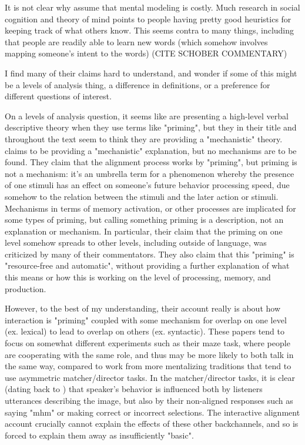 \documentclass[]{article}
\begin{document}
It is not clear why \cite{pickering2004} assume that mental modeling is costly. Much research in social cognition and theory of mind points to people having pretty good heuristics for keeping track of what others know. This seems contra to many things, including that people are readily able to learn new words (which somehow involves mapping someone's intent to the words) (CITE SCHOBER COMMENTARY)

I find many of their claims hard to understand, and wonder if some of this might be a levels of analysis thing, a difference in definitions, or a preference for different questions of interest. 

On a levels of analysis question, it seems like \cite{pickering2004} are presenting a high-level verbal descriptive theory when they use terms like "priming", but they in their title and throughout the text seem to think they are providing a "mechanistic" theory. \cite{pickering2004} claims to be providing a "mechanistic" explanation, but no mechanisms are to be found. They claim that the alignment process works by "priming", but priming is not a mechanism: it's an umbrella term for a phenomenon whereby the presence of one stimuli has an effect on someone's future behavior processing speed, due somehow to the relation between the stimuli and the later action or stimuli. Mechanisms in terms of memory activation, or other processes are implicated for some types of priming, but calling something priming is a description, not an explanation or mechanism. In particular, their claim that the priming on one level somehow spreads to other levels, including outside of language, was criticized by many of their commentators. They also claim that this "priming" is "resource-free and automatic", without providing a further explanation of what this means or how this is working on the level of processing, memory, and production. 

However, to the best of my understanding, their account really is about how interaction is "priming" coupled with some mechanism for overlap on one level (ex. lexical) to lead to overlap on others (ex. syntactic). These papers tend to focus on somewhat different experiments such as their maze task, where people are cooperating with the same role, and thus may be more likely to both talk in the same way, compared to work from more mentalizing traditions that tend to use asymmetric matcher/director tasks. In the matcher/director tasks, it is clear (dating back to \cite{krauss1966}) that speaker's behavior is influenced both by listeners utterances describing the image, but also by their non-aligned responses such as saying "mhm" or making correct or incorrect selections. The interactive alignment account crucially cannot explain the effects of these other backchannels, and so is forced to explain them away as insufficiently "basic". 
\end{document}
